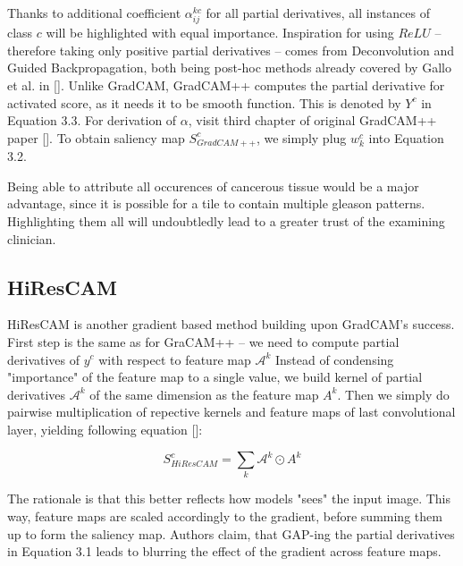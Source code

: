 Thanks to additional coefficient $\alpha^{kc}_{ij}$ for all partial derivatives, all instances of class $c$ will be highlighted with equal importance. Inspiration for using $ReLU$ -- therefore taking only positive partial derivatives -- comes from Deconvolution and Guided Backpropagation, both being post-hoc methods already covered by Gallo et al. in []. Unlike GradCAM, GradCAM++ computes the partial derivative for activated score, as it needs it to be smooth function. This is denoted by $Y^c$ in Equation 3.3. For derivation of $\alpha$, visit third chapter of original GradCAM++ paper []. To obtain saliency map $S^c_{GradCAM++}$, we simply plug $w^c_k$ into Equation 3.2.


Being able to attribute all occurences of cancerous tissue would be a major advantage, since it is possible for a tile to contain multiple gleason patterns. Highlighting them all will undoubtledly lead to a greater trust of the examining clinician.

\subsection{HiResCAM}

HiResCAM is another gradient based method building upon GradCAM's success. First step is the same as for GraCAM++ -- we need to compute partial derivatives of $y^c$ with respect to feature map $\mathcal{A}^k$ Instead of condensing "importance" of the feature map to a single value, we build kernel of partial derivatives $\mathcal{A}^k$ of the same dimension as the feature map $A^k$. Then we simply do pairwise multiplication of repective kernels and feature maps of last convolutional layer, yielding following equation []: 

\begin{equation}
    S^c_{HiResCAM} = \sum_k \mathcal{A}^k \odot A^k
\end{equation}

The rationale is that this better reflects how models "sees" the input image. This way, feature maps are scaled accordingly to the gradient, before summing them up to form the saliency map. Authors claim, that GAP-ing the partial derivatives in Equation 3.1 leads to blurring the effect of the gradient across feature maps. 

